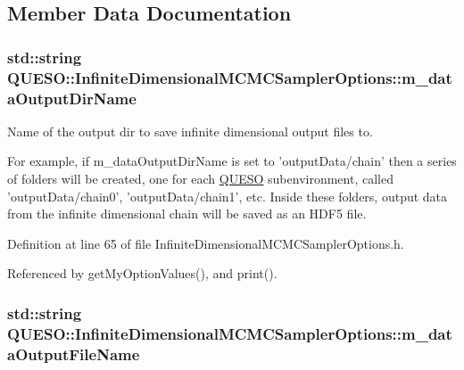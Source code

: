 \subsection{Member Data Documentation}
\hypertarget{class_q_u_e_s_o_1_1_infinite_dimensional_m_c_m_c_sampler_options_a224d09b8aa3f31aa2134338ae2a60018}{
\subsubsection[{m\-\_\-data\-Output\-Dir\-Name}]{\setlength{\rightskip}{0pt plus 5cm}std\-::string Q\-U\-E\-S\-O\-::\-Infinite\-Dimensional\-M\-C\-M\-C\-Sampler\-Options\-::m\-\_\-data\-Output\-Dir\-Name}}\label{class_q_u_e_s_o_1_1_infinite_dimensional_m_c_m_c_sampler_options_a224d09b8aa3f31aa2134338ae2a60018}


Name of the output dir to save infinite dimensional output files to. 

For example, if {\ttfamily m\-\_\-data\-Output\-Dir\-Name} is set to 'output\-Data/chain' then a series of folders will be created, one for each \hyperlink{namespace_q_u_e_s_o}{Q\-U\-E\-S\-O} subenvironment, called 'output\-Data/chain0', 'output\-Data/chain1', etc. Inside these folders, output data from the infinite dimensional chain will be saved as an H\-D\-F5 file. 

Definition at line 65 of file Infinite\-Dimensional\-M\-C\-M\-C\-Sampler\-Options.\-h.



Referenced by get\-My\-Option\-Values(), and print().

\hypertarget{class_q_u_e_s_o_1_1_infinite_dimensional_m_c_m_c_sampler_options_a2146a3f4d0f276081484743bf3c5b5aa}{
\subsubsection[{m\-\_\-data\-Output\-File\-Name}]{\setlength{\rightskip}{0pt plus 5cm}std\-::string Q\-U\-E\-S\-O\-::\-Infinite\-Dimensional\-M\-C\-M\-C\-Sampler\-Options\-::m\-\_\-data\-Output\-File\-Name}}\label{class_q_u_e_s_o_1_1_infinite_dimensional_m_c_m_c_sampler_options_a2146a3f4d0f276081484743bf3c5b5aa}


